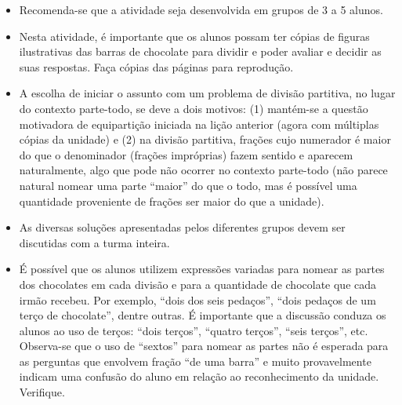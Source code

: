 \begin{multicols}{2}
\begin{orientacoes}
\begin{itemize} %
   \item Recomenda-se que a atividade seja desenvolvida em grupos de 3 a 5 alunos.
   \item Nesta atividade, é importante que os alunos possam ter cópias de figuras ilustrativas das barras de chocolate para dividir e poder avaliar e decidir as suas respostas. Faça cópias das páginas para reprodução.
   \item A escolha de iniciar o assunto com um problema de divisão partitiva, no lugar do contexto parte-todo, se deve a dois motivos: (1) mantém-se a questão motivadora de equipartição iniciada na lição anterior (agora com múltiplas cópias da unidade) e (2) na divisão partitiva, frações cujo numerador é maior do que o denominador (frações impróprias) fazem sentido e aparecem naturalmente, algo que pode não ocorrer no contexto parte-todo (não parece natural nomear uma parte ``maior'' do que o todo, mas é possível uma quantidade proveniente de frações ser maior do que a unidade).
   \item As diversas soluções apresentadas pelos diferentes grupos devem ser discutidas com a turma inteira.
   \item É possível que os alunos utilizem expressões variadas para nomear as partes dos chocolates em cada divisão e para a quantidade de chocolate que cada irmão recebeu. Por exemplo, ``dois dos seis pedaços'', ``dois pedaços de um terço de chocolate'', dentre outras. É importante que a discussão conduza os alunos ao uso de terços:       ``dois terços'', ``quatro terços'', ``seis terços'', etc. Observa-se que o uso de ``sextos'' para nomear as partes não é esperada para as perguntas que envolvem fração ``de uma barra'' e muito provavelmente indicam uma confusão do aluno em relação ao reconhecimento da unidade. Verifique.
  
\end{itemize} %

\end{orientacoes}


\end{multicols}
